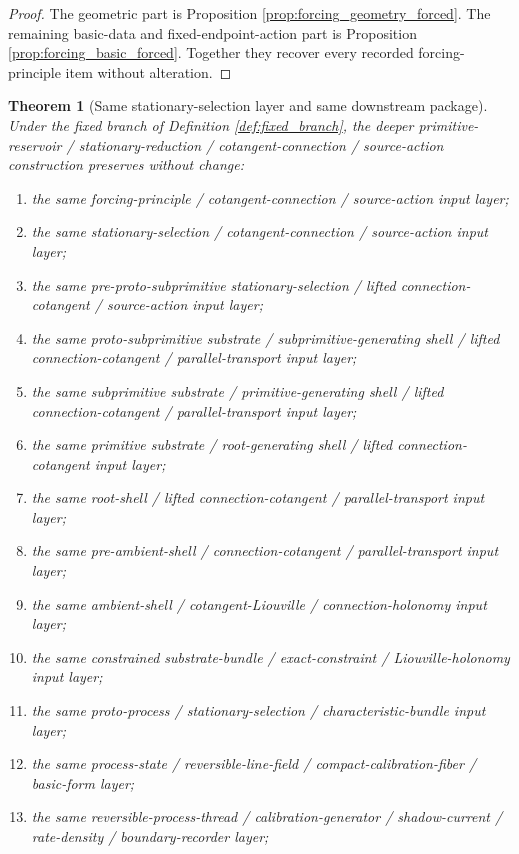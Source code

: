 \documentclass[11pt]{article}
\newtheorem{theorem}{Theorem}
\begin{document}
\begin{proof}
The geometric part is Proposition \ref{prop:forcing_geometry_forced}. The remaining basic-data and fixed-endpoint-action part is Proposition \ref{prop:forcing_basic_forced}. Together they recover every recorded forcing-principle item without alteration.
\end{proof}

\begin{theorem}[Same stationary-selection layer and same downstream package]
\label{thm:same_package}
Under the fixed branch of Definition \ref{def:fixed_branch}, the deeper primitive-reservoir / stationary-reduction / cotangent-connection / source-action construction preserves without change:
\begin{enumerate}
    \item the same forcing-principle / cotangent-connection / source-action input layer;
    \item the same stationary-selection / cotangent-connection / source-action input layer;
    \item the same pre-proto-subprimitive stationary-selection / lifted connection-cotangent / source-action input layer;
    \item the same proto-subprimitive substrate / subprimitive-generating shell / lifted connection-cotangent / parallel-transport input layer;
    \item the same subprimitive substrate / primitive-generating shell / lifted connection-cotangent / parallel-transport input layer;
    \item the same primitive substrate / root-generating shell / lifted connection-cotangent input layer;
    \item the same root-shell / lifted connection-cotangent / parallel-transport input layer;
    \item the same pre-ambient-shell / connection-cotangent / parallel-transport input layer;
    \item the same ambient-shell / cotangent-Liouville / connection-holonomy input layer;
    \item the same constrained substrate-bundle / exact-constraint / Liouville-holonomy input layer;
    \item the same proto-process / stationary-selection / characteristic-bundle input layer;
    \item the same process-state / reversible-line-field / compact-calibration-fiber / basic-form layer;
    \item the same reversible-process-thread / calibration-generator / shadow-current / rate-density / boundary-recorder layer;

\end{enumerate}
\end{theorem}
\end{document}
